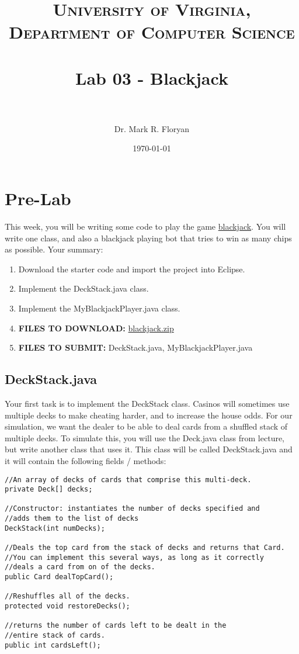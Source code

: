 \documentclass[paper=a4, fontsize=11pt, parskip=full]{scrartcl} %
\title{
\normalfont \normalsize
\textsc{University of Virginia, Department of Computer Science} \\ [25pt] %
\horrule{0.5pt} \\[0.4cm] %
\huge Lab 03 - Blackjack \\ %
\horrule{2pt} \\[0.5cm] %
}
\author{Dr. Mark R. Floryan} %
\date{\normalsize\today} %
\numberwithin{equation}{section} %
\numberwithin{figure}{section} %
\numberwithin{table}{section} %
\begin{document}
\maketitle %


\section{Pre-Lab}

This week, you will be writing some code to play the game \href{https://en.wikipedia.org/wiki/Blackjack}{blackjack}. You will write one class, and also a blackjack playing bot that tries to win as many chips as possible. Your summary:

\begin{enumerate}
	\item Download the starter code and import the project into Eclipse.
	\item Implement the DeckStack.java class.
	\item Implement the MyBlackjackPlayer.java class.
	\item \textbf{FILES TO DOWNLOAD:} \href{https://markfloryan.github.io/dsa1/labs/lab03%20-%20Blackjack/code/blackjack.zip}{blackjack.zip}
	\item \textbf{FILES TO SUBMIT:} DeckStack.java, MyBlackjackPlayer.java
\end{enumerate}


\subsection{DeckStack.java}

Your first task is to implement the DeckStack class. Casinos will sometimes use multiple decks to make cheating harder, and to increase the house odds. For our simulation, we want the dealer to be able to deal cards from a shuffled stack of multiple decks. To simulate this, you will use the Deck.java class from lecture, but write another class that uses it. This class will be called DeckStack.java and it will contain the following fields / methods:

\begin{lstlisting}
//An array of decks of cards that comprise this multi-deck.
private Deck[] decks;

//Constructor: instantiates the number of decks specified and
//adds them to the list of decks
DeckStack(int numDecks);

//Deals the top card from the stack of decks and returns that Card.
//You can implement this several ways, as long as it correctly
//deals a card from on of the decks.
public Card dealTopCard();

//Reshuffles all of the decks.
protected void restoreDecks();

//returns the number of cards left to be dealt in the
//entire stack of cards.
public int cardsLeft();
\end{lstlisting}
\end{document}
